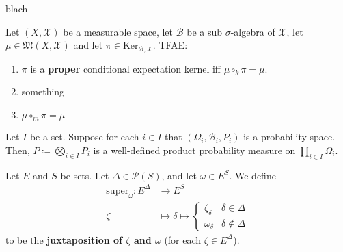 \begin{lemma}
    \label{lem:cond-exp-ker-markov-char}
    \leanok

    blach
\end{lemma}


\begin{lemma}
    \label{lem:cond-exp-ker-proper-char}
    \leanok

    Let $(X,\mathcal{X})$ be a measurable space, let $\mathcal{B}$ be a sub $\sigma$-algebra of $\mathcal{X}$, let $\mu\in\mathfrak{M}(X,\mathcal{X})$ and let $\pi\in\text{Ker}_{\mathcal{B},\mathcal{X}}$. TFAE:
    \begin{enumerate}
        \item $\pi$ is a \textbf{proper} conditional expectation kernel iff $\mu\circ_k \pi=\mu$.
        \item something
        \item $\mu\circ_m\pi=\mu$
    \end{enumerate}
\end{lemma}


\begin{definition}
    \label{def:product-probability-measure}
    \leanok

    Let $I$ be a set. Suppose for each $i\in I$ that $(\Omega_i,\mathcal{B}_i,P_i)$ is a probability space. Then, $P\coloneqq\bigotimes_{i\in I}P_i$ is a well-defined product probability measure on $\prod_{i\in I}\Omega_i$.
\end{definition}

\begin{definition}[Juxtaposition]
    \label{def:juxtaposition}
    \leanok

    Let $E$ and $S$ be sets. Let $\Delta\in\mathcal{P}(S)$, and let $\omega\in E^S$. We define
    \begin{align}
        \text{super}_\omega:E^\Delta&\to E^S\\
        \zeta&\mapsto \delta\mapsto\begin{cases}
            \zeta_\delta & \delta\in\Delta\\
            \omega_\delta & \delta\notin\Delta
        \end{cases}
    \end{align}
    to be the \textbf{juxtaposition of $\zeta$ and $\omega$} (for each $\zeta\in E^\Delta$).
\end{definition}
